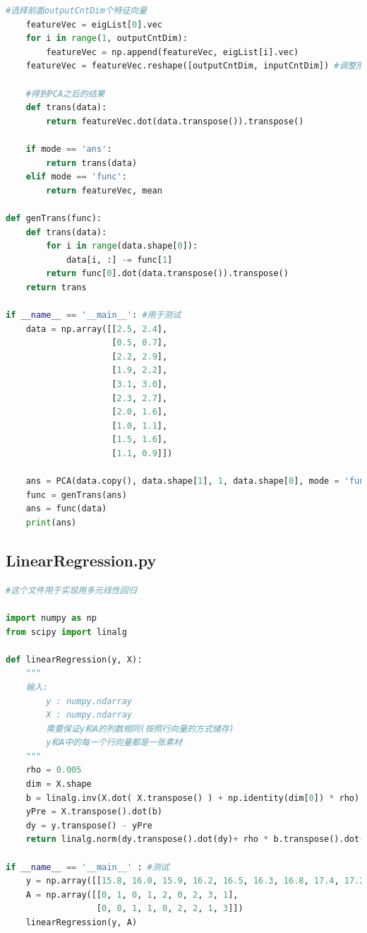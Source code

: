\documentclass[fleqn,10pt]{SelfArx} %
\begin{document}
\begin{lstlisting}[language=python]
    #选择前面outputCntDim个特征向量
    featureVec = eigList[0].vec
    for i in range(1, outputCntDim):
        featureVec = np.append(featureVec, eigList[i].vec)
    featureVec = featureVec.reshape([outputCntDim, inputCntDim]) #调整形状

    #得到PCA之后的结果
    def trans(data):
        return featureVec.dot(data.transpose()).transpose()

    if mode == 'ans': 
        return trans(data)
    elif mode == 'func':
        return featureVec, mean

def genTrans(func):
    def trans(data):
        for i in range(data.shape[0]):
            data[i, :] -= func[1]
        return func[0].dot(data.transpose()).transpose()
    return trans

if __name__ == '__main__': #用于测试
    data = np.array([[2.5, 2.4],
                     [0.5, 0.7],
                     [2.2, 2.9],
                     [1.9, 2.2],
                     [3.1, 3.0],
                     [2.3, 2.7],
                     [2.0, 1.6],
                     [1.0, 1.1],
                     [1.5, 1.6],
                     [1.1, 0.9]])
                     
    ans = PCA(data.copy(), data.shape[1], 1, data.shape[0], mode = 'func')
    func = genTrans(ans)
    ans = func(data)
    print(ans)
\end{lstlisting}

\subsection*{LinearRegression.py}
\begin{lstlisting}[language=python]
#这个文件用于实现用多元线性回归

import numpy as np
from scipy import linalg

def linearRegression(y, X):
    """
    输入:
        y : numpy.ndarray
        X : numpy.ndarray
        需要保证y和A的列数相同(按照行向量的方式储存)
        y和A中的每一个行向量都是一张素材
    """
    rho = 0.005
    dim = X.shape
    b = linalg.inv(X.dot( X.transpose() ) + np.identity(dim[0]) * rho).dot(X.dot( y.transpose() )) #加了一个单位矩阵, 保证可逆
    yPre = X.transpose().dot(b)
    dy = y.transpose() - yPre
    return linalg.norm(dy.transpose().dot(dy)+ rho * b.transpose().dot(b))

if __name__ == '__main__' : #测试
    y = np.array([[15.8, 16.0, 15.9, 16.2, 16.5, 16.3, 16.8, 17.4, 17.2]])
    A = np.array([[0, 1, 0, 1, 2, 0, 2, 3, 1],
                  [0, 0, 1, 1, 0, 2, 2, 1, 3]])
    linearRegression(y, A)
\end{lstlisting}
\end{document}
